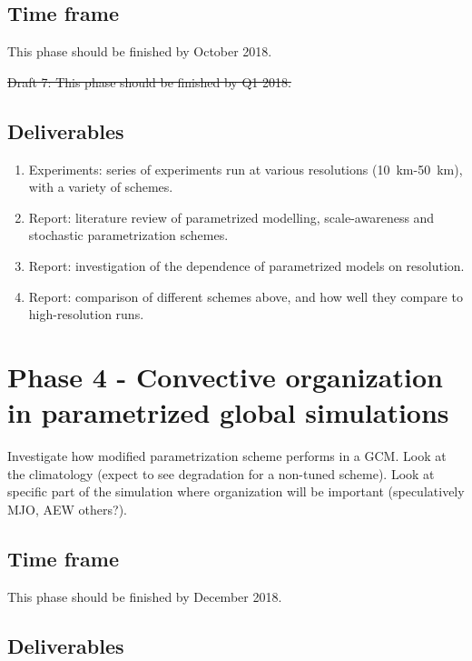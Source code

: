 \documentclass[11pt,a4paper]{article}
\begin{document}
\subsection*{Time frame}

This phase should be finished by October 2018.

\sout{Draft 7: This phase should be finished by Q1 2018.}

\subsection*{Deliverables}
\begin{enumerate}
    \item Experiments: series of experiments run at various resolutions (\SI{10}{km}-\SI{50}{km}), with a variety of schemes.
    \item Report: literature review of parametrized modelling, scale-awareness and stochastic parametrization schemes.
    \item Report: investigation of the dependence of parametrized models on resolution.
    \item Report: comparison of different schemes above, and how well they compare to high-resolution runs.
\end{enumerate}

\section*{Phase 4 - Convective organization in parametrized global simulations}

Investigate how modified parametrization scheme performs in a GCM. Look at the climatology (expect to see degradation for a non-tuned scheme). Look at specific part of the simulation where organization will be important (speculatively MJO, AEW others?). 

\subsection*{Time frame}

This phase should be finished by December 2018.

\subsection*{Deliverables}
\end{document}
